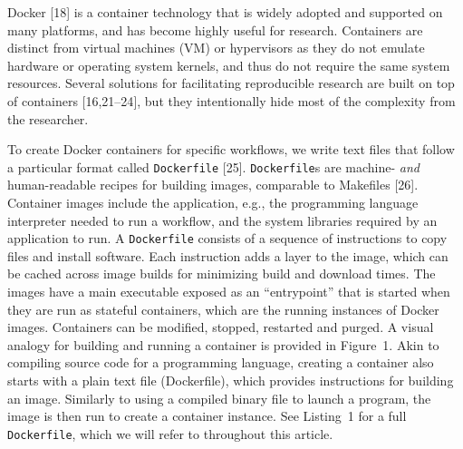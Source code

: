 \documentclass[10pt,letterpaper]{article}
\begin{document}
Docker {[}18{]} is a container technology that is widely adopted and
supported on many platforms, and has become highly useful for research.
Containers are distinct from virtual machines (VM) or hypervisors as
they do not emulate hardware or operating system kernels, and thus do
not require the same system resources. Several solutions for
facilitating reproducible research are built on top of containers
{[}16,21--24{]}, but they intentionally hide most of the complexity from
the researcher.

To create Docker containers for specific workflows, we write text files
that follow a particular format called \texttt{Dockerfile} {[}25{]}.
\texttt{Dockerfile}s are machine- \emph{and} human-readable recipes for
building images, comparable to Makefiles {[}26{]}. Container images
include the application, e.g., the programming language interpreter
needed to run a workflow, and the system libraries required by an
application to run. A \texttt{Dockerfile} consists of a sequence of
instructions to copy files and install software. Each instruction adds a
layer to the image, which can be cached across image builds for
minimizing build and download times. The images have a main executable
exposed as an ``entrypoint'' that is started when they are run as
stateful containers, which are the running instances of Docker images.
Containers can be modified, stopped, restarted and purged. A visual
analogy for building and running a container is provided in Figure~1.
Akin to compiling source code for a programming language, creating a
container also starts with a plain text file (Dockerfile), which
provides instructions for building an image. Similarly to using a
compiled binary file to launch a program, the image is then run to
create a container instance. See Listing~1 for a full
\texttt{Dockerfile}, which we will refer to throughout this article.
\end{document}
